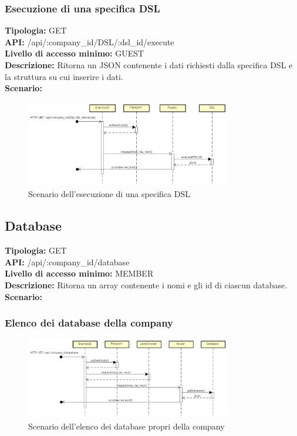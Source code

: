 \newpage
\subsubsection{Esecuzione di una specifica DSL}
\textbf{Tipologia:} GET \\
\textbf{API:} /api/:company\_id/DSL/:dsl\_id/execute \\
\textbf{Livello di accesso minimo:} GUEST \\
\textbf{Descrizione:} Ritorna un JSON contenente i dati richiesti dalla specifica DSL e la struttura su cui inserire i dati. \\
\textbf{Scenario:} 
\begin{figure}[h]
\centering
\includegraphics[width=0.8\textwidth]{res/sections/backend/(GET)dslByIDex.png}
\caption{Scenario dell'esecuzione di una specifica DSL}
\end{figure}

\newpage
\subsection{Database}
\textbf{Tipologia:} GET \\
\textbf{API:} /api/:company\_id/database \\
\textbf{Livello di accesso minimo:} MEMBER \\
\textbf{Descrizione:} Ritorna un array contenente i nomi e gli id di ciascun database. \\
\textbf{Scenario:}
\subsubsection{Elenco dei database della company}
\begin{figure}[h]
\centering
\includegraphics[width=0.8\textwidth]{res/sections/backend/(GET)database.png}
\caption{Scenario dell'elenco dei database propri della company}
\end{figure}

